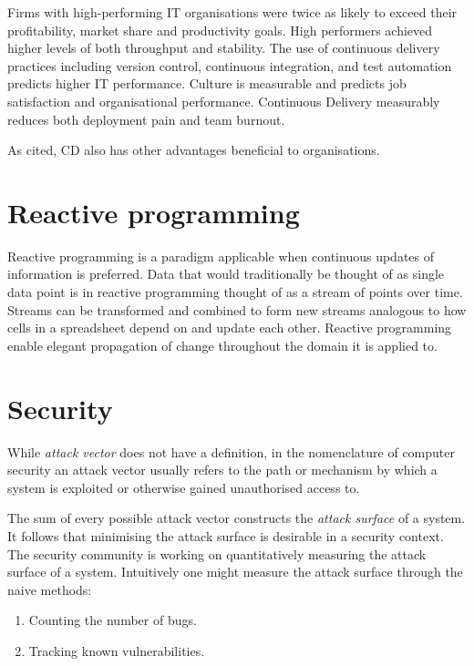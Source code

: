 \begin{displayquote}
    Firms with high-performing IT organisations were twice as likely to exceed their profitability, market share and productivity goals.
    High performers achieved higher levels of both throughput and stability.
    The use of continuous delivery practices including version control, continuous integration, and test automation predicts higher IT performance.
    Culture is measurable and predicts job satisfaction and organisational performance.
    Continuous Delivery measurably reduces both deployment pain and team burnout\cite{forsgren}.
\end{displayquote}

As cited, CD also has other advantages beneficial to organisations.

\section{Reactive programming}
Reactive programming is a paradigm applicable when continuous updates of information is preferred. Data that would traditionally be thought of as single data point is in reactive programming thought of as a stream of points over time. Streams can be transformed and combined to form new streams analogous to how cells in a spreadsheet depend on and update each other. Reactive programming enable elegant propagation of change throughout the domain it is applied to.

\newpage
\section{Security}
While \textit{attack vector} does not have a definition, in the nomenclature of computer security an attack vector usually refers to the path or mechanism by which a system is exploited or otherwise gained unauthorised access to\cite{av1}\cite{av2}\cite{av3}.


The sum of every possible attack vector constructs the \textit{attack surface} of a system. It follows that minimising the attack surface is desirable\cite[p.~1]{as} in a security context. The security community is working on quantitatively measuring the attack surface of a system. Intuitively one might measure the attack surface through the naive methods:

\begin{enumerate}
    \item Counting the number of bugs.
    \item Tracking known vulnerabilities.
\end{enumerate}

